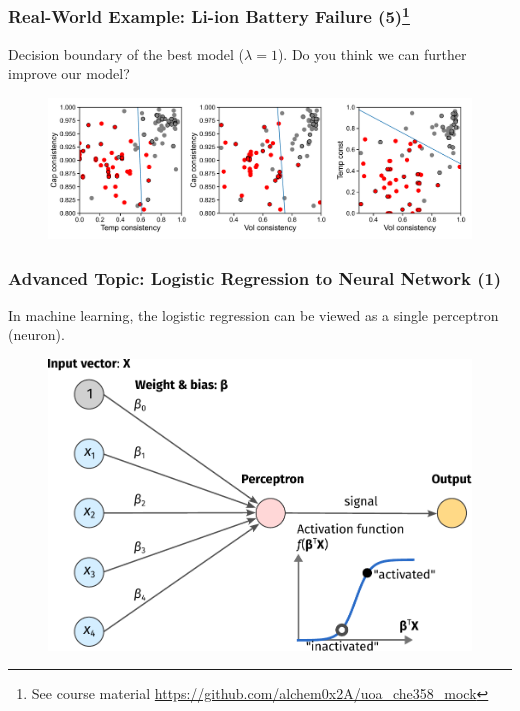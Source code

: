 \documentclass[10pt,aspectratio=169]{beamer}
\begin{document}
      \begin{frame}
        \frametitle{Real-World Example: Li-ion Battery Failure
          (5)\let\thefootnote\relax\footnote{{\scriptsize See course
              material
              \url{https://github.com/alchem0x2A/uoa_che358_mock}}}}

        Decision boundary of the best model ($\lambda = 1$). Do you
        think we can further improve our model?

        \begin{figure}
          \includegraphics[width=\textwidth]{scripts/batter_decision.pdf}
        \end{figure}
        
        
      \end{frame}

      \begin{frame}
        \frametitle{Advanced Topic: Logistic Regression to Neural
          Network (1)}
        In machine learning, the logistic regression can be viewed as
        a single perceptron (neuron).

        \begin{figure}[t]
          \includegraphics[width=0.65\linewidth]{images/nn-1.pdf}
        \end{figure}

        
      \end{frame}
\end{document}
